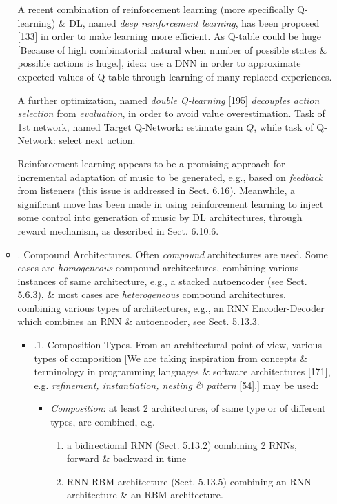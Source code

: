 \documentclass{article}
\begin{document}
\begin{itemize}
\begin{itemize}
		A recent combination of reinforcement learning (more specifically Q-learning) \& DL, named {\it deep reinforcement learning}, has been proposed [133] in order to make learning more efficient. As Q-table could be huge [Because of high combinatorial natural when number of possible states \& possible actions is huge.], idea: use a DNN in order to approximate expected values of Q-table through learning of many replaced experiences.
		
		A further optimization, named {\it double Q-learning} [195] {\it decouples action selection} from {\it evaluation}, in order to avoid value overestimation. Task of 1st network, named Target Q-Network: estimate gain $Q$, while task of Q-Network: select next action.
		
		Reinforcement learning appears to be a promising approach for incremental adaptation of music to be generated, e.g., based on {\it feedback} from listeners (this issue is addressed in Sect. 6.16). Meanwhile, a significant move has been made in using reinforcement learning to inject some control into generation of music by DL architectures, through reward mechanism, as described in Sect. 6.10.6.
		\item {. Compound Architectures.} Often {\it compound} architectures are used. Some cases are {\it homogeneous} compound architectures, combining various instances of same architecture, e.g., a stacked autoencoder (see Sect. 5.6.3), \& most cases are {\it heterogeneous} compound architectures, combining various types of architectures, e.g., an RNN Encoder-Decoder which combines an RNN \& autoencoder, see Sect. 5.13.3.
		\begin{itemize}
			\item {.1. Composition Types.} From an architectural point of view, various types of composition [We are taking inspiration from concepts \& terminology in programming languages \& software architectures [171], e.g. {\it refinement, instantiation, nesting \& pattern} [54].] may be used:
			\begin{itemize}
				\item {\it Composition}: at least 2 architectures, of same type or of different types, are combined, e.g.
				\begin{enumerate}
					\item a bidirectional RNN (Sect. 5.13.2) combining 2 RNNs, forward \& backward in time
					\item RNN-RBM architecture (Sect. 5.13.5) combining an RNN architecture \& an RBM architecture.
				\end{enumerate}

\end{itemize}
\end{itemize}
\end{itemize}
\end{itemize}
\end{document}
